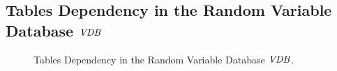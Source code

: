 \documentclass{sfuthesis}
\begin{document}
\begin{appendices}
\section {Tables  Dependency in the Random Variable Database ${\it VDB }$}
\begin{figure}[H]
\begin{center}
\caption{Tables  Dependency in the Random Variable Database ${\it VDB }$.
\label{fig:rv_db1}}
\end{center}
\end{figure}



\end{appendices}
\end{document}
